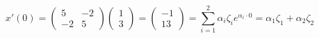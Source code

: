 \documentclass[10pt,oneside,a4paper]{scrartcl}
\begin{document}
	\begin{equation*}
		 x'(0) = \begin{pmatrix}
				5 & -2 \\
				-2 & 5 
				\end{pmatrix}\begin{pmatrix}
							1 \\
							3 
						\end{pmatrix} = \begin{pmatrix}
									-1 \\
									13 
								\end{pmatrix} = 
		 \sum\limits_{i=1}^{2} \alpha_{i}\zeta_{i}e^{\alpha_{i}\cdot0} = 
		\alpha_1\zeta_1 +\alpha_2 \zeta_2
	\end{equation*}
	
\end{document}
